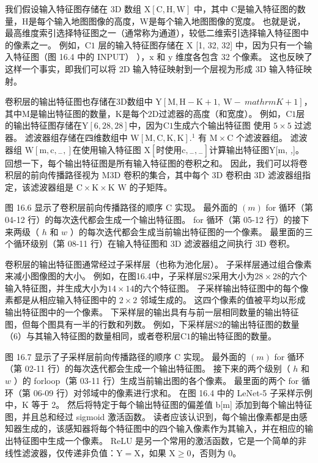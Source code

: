 我们假设输入特征图存储在 $3 \mathrm{D}$ 数组 $\mathrm{X}[\mathrm{C}, \mathrm{H}, \mathrm{W}]$ 中，其中 $\mathrm {C}$是输入特征图的数量，$\mathrm{H}$是每个输入地图图像的高度，$\mathrm{W}$是每个输入地图图像的宽度。 也就是说，最高维度索引选择特征图之一（通常称为通道），较低二维索引选择输入特征图中的像素之一。 例如，$\mathrm{C} 1$ 层的输入特征图存储在 $\mathrm{X}$ [1, 32, 32] 中，因为只有一个输入特征图（图 16.4 中的 INPUT） ），$\mathrm{x}$ 和 $\mathrm{y}$ 维度各包含 32 个像素。 这也反映了这样一个事实，即我们可以将 2D 输入特征映射到一个层视为形成 3D 输入特征映射。

卷积层的输出特征图也存储在3D数组中 $\mathrm{Y}[\mathrm{M}, \mathrm{H}-\mathrm{K}+1, \mathrm{~W}-\ mathrm{K}+1]$，其中$\mathrm{M}$是输出特征图的数量，$\mathrm{K}$是每个$2\mathrm{D}$过滤器的高度（和宽度）。 例如，$\mathrm{C} 1$层的输出特征图存储在$\mathrm{Y}[6,28,28]$中，因为$\mathrm{C} 1$生成六个输出特征图 使用 $5 \times 5$ 过滤器。 滤波器组存储在四维数组中 $\mathrm{W}[\mathrm{M}, \mathrm{C}, \mathrm{K}, \mathrm{K}] .{ }^{1}$ 有 $\mathrm{M} \times \mathrm{C}$ 个滤波器组。 滤波器组 $\mathrm{W}\left[\mathrm{m}, \mathrm{c},{ }_{-},\right]$在使用输入特征图 $\mathrm{X}\left[ 时使用 \mathrm{c},{ }_{-},{ }_{-}\right]$计算输出特征图$\mathrm{Y}[\mathrm{m}$, \textit{,}]。 回想一下，每个输出特征图是所有输入特征图的卷积之和。 因此，我们可以将卷积层的前向传播路径视为 $\mathrm{M} 3 \mathrm{D}$ 卷积的集合，其中每个 3D 卷积由 $3 \mathrm{D}$ 滤波器组指定，该滤波器组是 $\mathrm{C} \times \mathrm{K} \times \mathrm{K}$ $\mathrm{W}$ 的子矩阵。

图 16.6 显示了卷积层前向传播路径的顺序 $\mathrm{C}$ 实现。 最外面的 $(m)$ for 循环（第 04-12 行）的每次迭代都会生成一个输出特征图。 for 循环（第 05-12 行）的接下来两级（ $h$ 和 $w$ ）的每次迭代都会生成当前输出特征图的一个像素。 最里面的三个循环级别（第 08-11 行）在输入特征图和 3D 滤波器组之间执行 3D 卷积。

卷积层的输出特征图通常经过子采样层（也称为池化层）。 子采样层通过组合像素来减小图像图的大小。 例如，在图16.4中，子采样层S2采用大小为$28×28$的六个输入特征图，并生成大小为$14×14$的六个特征图。 子采样输出特征图中的每个像素都是从相应输入特征图中的 $2 \times 2$ 邻域生成的。 这四个像素的值被平均以形成输出特征图中的一个像素。 下采样层的输出具有与前一层相同数量的输出特征图，但每个图具有一半的行数和列数。 例如，下采样层S2的输出特征图的数量（6）与其输入特征图的数量相同，或者卷积层$\mathrm{C} 1$的输出特征图的数量。

图 16.7 显示了子采样层前向传播路径的顺序 $\mathrm{C}$ 实现。 最外面的 $(m)$ for 循环（第 02-11 行）的每次迭代都会生成一个输出特征图。 接下来的两个级别（ $h$ 和 $w$ ）的 forloop（第 03-11 行）生成当前输出图的各个像素。 最里面的两个 for 循环（第 06-09 行）对邻域中的像素进行求和。 在图 16.4 中的 LeNet-5 子采样示例中，$\mathrm{K}$ 等于 2。 然后将特定于每个输出特征图的偏差值 b[m] 添加到每个输出特征图，并且总和经过 sigmoid 激活函数。 读者应该认识到，每个输出像素都是由感知器生成的，该感知器将每个特征图中的四个输入像素作为其输入，并在相应的输出特征图中生成一个像素。 ReLU 是另一个常用的激活函数，它是一个简单的非线性滤波器，仅传递非负值：$\mathrm{Y}=\mathrm{X}$，如果 $\mathrm{X} \geq 0$，否则为 0。

